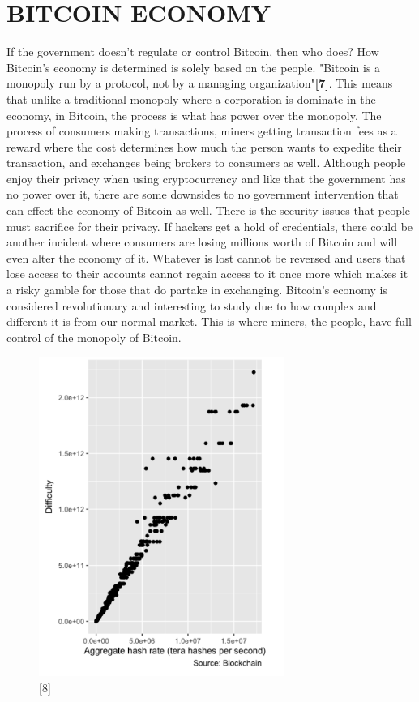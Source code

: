 \documentclass[letterpaper, 10 pt, conference]{ieeeconf}  %
\begin{document}
\section{BITCOIN ECONOMY}
If the government doesn't regulate or control Bitcoin, then who does? How Bitcoin's economy is determined is solely based on the people. "Bitcoin is a monopoly run by a protocol, not by a managing organization"\textbf{[7]}. This means that unlike a traditional monopoly where a corporation is dominate in the economy, in Bitcoin, the process is what has power over the monopoly. The process of consumers making transactions, miners getting transaction fees as a reward where the cost determines how much the person wants to expedite their transaction, and exchanges being brokers to consumers as well. Although people enjoy their privacy when using cryptocurrency and like that the government has no power over it, there are some downsides to no government intervention that can effect the economy of Bitcoin as well. There is the security issues that people must sacrifice for their privacy. If hackers get a hold of credentials, there could be another incident where consumers are losing millions worth of Bitcoin and will even alter the economy of it. Whatever is lost cannot be reversed and users that lose access to their accounts cannot regain access to it once more which makes it a risky gamble for those that do partake in exchanging. Bitcoin's economy is considered revolutionary and interesting to study due to how complex and different it is from our normal market. This is where miners, the people, have full control of the monopoly of Bitcoin. 
\begin{figure}[h!]
  \includegraphics[width=8cm]{ye.PNG}
  \caption*{[8]}
\end{figure}
\end{document}

